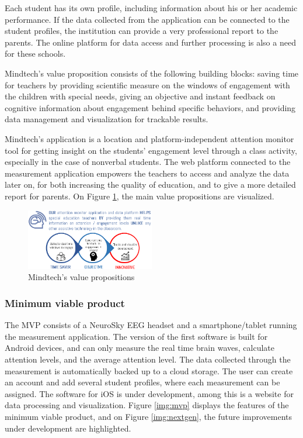 \documentclass[letterpaper,10pt]{article}
\begin{document}
Each student has its own profile, including information about his or her academic performance. If the data collected from the application can be connected to the student profiles, the institution can provide a very professional report to the parents. The online platform for data access and further processing is also a need for these schools.

Mindtech's value proposition consists of the following building blocks: saving time for teachers by providing scientific measure on the windows of engagement with the children with special needs, giving an objective and instant feedback on cognitive information about engagement behind specific behaviors, and providing data management and visualization for trackable results.

Mindtech's application is a location and platform-independent attention monitor tool for getting insight on the students’ engagement level through a class activity, especially in the case of nonverbal students. The web platform connected to the measurement application empowers the teachers to access and analyze the data later on, for both increasing the quality of education, and to give a more detailed report for parents. On Figure \ref{img:valprop}, the main value propositions are  visualized.


\begin{figure}
\centering
\includegraphics[width=0.5\textwidth]{valueprop.PNG}
\caption{\label{img:valprop}Mindtech's value propositions}
\end{figure}


\subsubsection{Minimum viable product}

The MVP consists of a NeuroSky EEG headset and a smartphone/tablet running the measurement application. The version of the first software is built for Android devices, and can only measure the real time brain waves, calculate attention levels, and the average attention level. The data collected through the measurement is automatically backed up to a cloud storage. The user can create an account and add several student profiles, where each measurement can be assigned. The software for iOS is under development, among this is a website for data processing and visualization. Figure \ref{img:mvp} displays the features of the minimum viable product, and on Figure \ref{img:nextgen}, the future improvements under development are highlighted.
\end{document}
